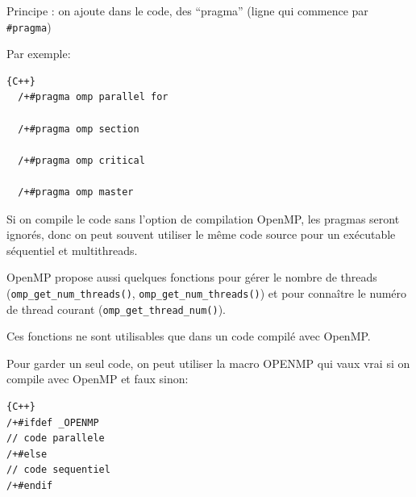 \documentclass{beamer}
\begin{document}
\begin{frame}[fragile]
Principe : on ajoute dans le code, des ``pragma'' (ligne qui commence par \verb|#pragma|)

\vfill
Par exemple:

\vfill
{}

\begin{lstlisting}{C++}
  /+#pragma omp parallel for

  /+#pragma omp section

  /+#pragma omp critical

  /+#pragma omp master
\end{lstlisting}

\vfill
Si on compile le code sans l'option de compilation OpenMP, les pragmas seront ignorés, donc on peut souvent utiliser le même code source pour un exécutable séquentiel et multithreads.   

\end{frame}

\begin{frame}[fragile]

OpenMP propose aussi quelques fonctions pour gérer le nombre de threads (\verb|omp_get_num_threads()|, \verb|omp_get_num_threads()|) et pour connaître le numéro de thread courant (\verb|omp_get_thread_num()|).

\vfill Ces fonctions ne sont utilisables que dans un code compilé avec OpenMP.

Pour garder un seul code, on peut utiliser la macro {\textunderscore}OPENMP qui vaux vrai si on compile avec OpenMP et faux sinon:
\begin{center}
\begin{lstlisting}{C++}
/+#ifdef _OPENMP
// code parallele
/+#else
// code sequentiel
/+#endif
\end{lstlisting}
\end{center}

\end{frame}
\end{document}

